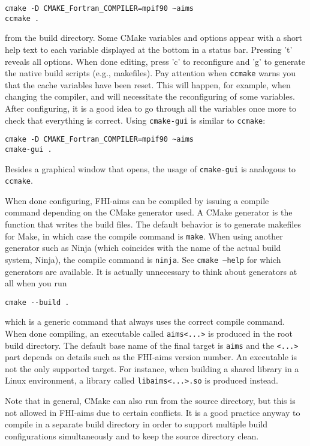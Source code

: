 \begin{itemize}
\begin{verbatim}
cmake -D CMAKE_Fortran_COMPILER=mpif90 ~aims
ccmake .
\end{verbatim}
  from the build directory. Some CMake variables and options appear with a short help text to each variable displayed at the bottom in a status bar. Pressing 't' reveals all options. When done editing, press 'c' to reconfigure and 'g' to generate the native build scripts (e.g., makefiles). Pay attention when \texttt{ccmake} warns you that the cache variables have been reset. This will happen, for example, when changing the compiler, and will necessitate the reconfiguring of some variables. After configuring, it is a good idea to go through all the variables once more to check that everything is correct. Using \texttt{cmake-gui} is similar to \texttt{ccmake}:
\begin{verbatim}
cmake -D CMAKE_Fortran_COMPILER=mpif90 ~aims
cmake-gui .
\end{verbatim}
  Besides a graphical window that opens, the usage of \texttt{cmake-gui} is analogous to \texttt{ccmake}.
\end{itemize}
When done configuring, FHI-aims can be compiled by issuing a compile command depending on the CMake generator used. A CMake generator is the function that writes the build files. The default behavior is to generate makefiles for Make, in which case the compile command is \texttt{make}. When using another generator such as Ninja (which coincides with the name of the actual build system, Ninja), the compile command is \texttt{ninja}. See \texttt{cmake --help} for which generators are available. It is actually unnecessary to think about generators at all when you run
\begin{verbatim}
cmake --build .
\end{verbatim}
which is a generic command that always uses the correct compile command. When done compiling, an executable called \texttt{aims<...>} is produced in the root build directory. The default base name of the final target is \texttt{aims} and the \texttt{<...>} part depends on details such as the FHI-aims version number. An executable is not the only supported target. For instance, when building a shared library in a Linux environment, a library called \texttt{libaims<...>.so} is produced instead.

Note that in general, CMake can also run from the source directory, but this is not allowed in FHI-aims due to certain conflicts. It is a good practice anyway to compile in a separate build directory in order to support multiple build configurations simultaneously and to keep the source directory clean.

